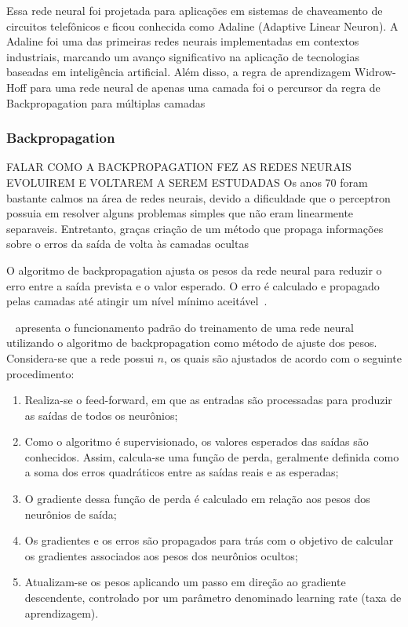             Essa rede neural foi projetada para aplicações em sistemas de chaveamento de circuitos telefônicos e 
            ficou conhecida como Adaline (Adaptive Linear Neuron). A Adaline foi uma das primeiras redes neurais 
            implementadas em contextos industriais, marcando um avanço significativo na aplicação de tecnologias 
            baseadas em inteligência artificial. Além disso, a regra de aprendizagem Widrow-Hoff para uma rede neural 
            de apenas uma camada foi o percursor da regra de Backpropagation para múltiplas camadas~\cite{Fausett1994,silva2010}
        
        
        \subsubsection{Backpropagation}
            
            FALAR COMO A BACKPROPAGATION FEZ AS REDES NEURAIS EVOLUIREM E VOLTAREM A SEREM ESTUDADAS
            Os anos 70 foram bastante calmos na área de redes neurais, devido a dificuldade que o perceptron 
            possuia em resolver alguns problemas simples que não eram linearmente separaveis. Entretanto, graças 
            criação de um método que propaga informações sobre o erros da saída de volta às camadas ocultas




            O algoritmo de backpropagation ajusta os pesos da rede neural para reduzir o erro entre a saída prevista 
            e o valor esperado. O erro é calculado e propagado pelas camadas até atingir um nível mínimo aceitável~\cite{marangoni2010}.
            
            ~ apresenta o funcionamento padrão do treinamento de uma rede neural utilizando o algoritmo 
            de backpropagation como método de ajuste dos pesos. Considera-se que a rede possui \( n\),  os quais são 
            ajustados de acordo com o seguinte procedimento:
            \begin{enumerate}
                \item Realiza-se o feed-forward, em que as entradas são processadas para produzir as saídas de todos os neurônios;
                \item Como o algoritmo é supervisionado, os valores esperados das saídas são conhecidos. Assim, calcula-se uma função de perda, geralmente definida como a soma dos erros quadráticos entre as saídas reais e as esperadas;
                \item O gradiente dessa função de perda é calculado em relação aos pesos dos neurônios de saída;
                \item Os gradientes e os erros são propagados para trás com o objetivo de calcular os gradientes associados aos pesos dos neurônios ocultos;
                \item Atualizam-se os pesos aplicando um passo em direção ao gradiente descendente, controlado por um parâmetro denominado learning rate (taxa de aprendizagem).
            \end{enumerate}
            
